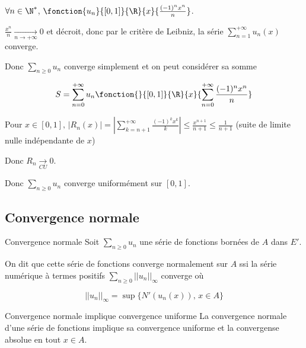 \begin{exemple}
    $\forall n \in \N^*$, $\fonction{u_n}{[0, 1]}{\R}{x}{\frac{(-1)^n x^n}{n}}$.

    
    \avspace $\displaystyle \frac{x^n }{n } \xrightarrow[n\to +\infty]{} 0$ et décroit, 
    donc par le critère de Leibniz, la série $\displaystyle \sum_{n = 1}^{ + \infty } u_n(x)$ converge.

    Donc $\displaystyle \sum_{n \geqslant 0} u_n$ converge simplement et on peut considérer sa somme 

    $$S = \sum_{n = 0}^{ + \infty } u_n \fonction{}{[0, 1]}{\R}{x}{\sum_{n = 0}^{ + \infty } \frac{(-1)^n x^n}{n}}$$


    \avspace Pour $x \in [0, 1], \, \displaystyle |R_n(x)| = \left| \sum_{k = n + 1}^{ + \infty } \frac{(-1)^k x^k}{k} \right| \leqslant \frac{x^{n + 1}}{n + 1} \leqslant \frac 1 {n + 1}$ 
    (suite de limite nulle indépendante de $x$)

    Donc $\displaystyle R_n \xrightarrow[CU]{} 0$.

    Donc $\displaystyle \sum_{n \geqslant 0} u_n$ converge uniformément sur $[0, 1]$.
\end{exemple}


\subsection{Convergence normale}

\begin{definition}{Convergence normale}{}
    Soit $\displaystyle \sum_{n \geqslant 0} u_n$ une série de fonctions bornées de $A$ dans $E'$.

    On dit que cette série de fonctions converge normalement sur $A$ ssi la série numérique 
    à termes positifs $\displaystyle \sum_{n \geqslant 0} || u_n ||_{\infty}$ converge où 

    $$||u_n||_{\infty} = \sup\{ N'(u_n(x)), \, x \in A \}$$
\end{definition}

\begin{theoreme}{Convergence normale implique convergence uniforme}{}
    La convergence normale d'une série de fonctions implique sa convergence uniforme et la convergense 
    absolue en tout $x \in A$. 
\end{theoreme}

